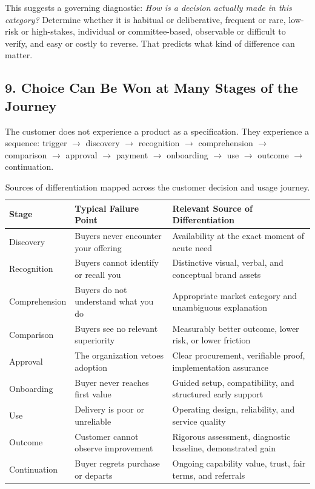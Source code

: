 This suggests a governing diagnostic: \emph{How is a decision actually made in this category?} Determine whether it is habitual or deliberative, frequent or rare, low-risk or high-stakes, individual or committee-based, observable or difficult to verify, and easy or costly to reverse. That predicts what kind of difference can matter.

\subsection*{9. Choice Can Be Won at Many Stages of the Journey}

The customer does not experience a product as a specification. They experience a sequence: trigger $\to$ discovery $\to$ recognition $\to$ comprehension $\to$ comparison $\to$ approval $\to$ payment $\to$ onboarding $\to$ use $\to$ outcome $\to$ continuation.

\begin{table}[t]
\centering
\small
\begin{tabularx}{\textwidth}{>{\raggedright\arraybackslash}p{2.8cm} >{\raggedright\arraybackslash}p{5.2cm} >{\raggedright\arraybackslash}X}
\toprule
\textbf{Stage} & \textbf{Typical Failure Point} & \textbf{Relevant Source of Differentiation} \\
\midrule
Discovery & Buyers never encounter your offering & Availability at the exact moment of acute need \\
Recognition & Buyers cannot identify or recall you & Distinctive visual, verbal, and conceptual brand assets \\
Comprehension & Buyers do not understand what you do & Appropriate market category and unambiguous explanation \\
Comparison & Buyers see no relevant superiority & Measurably better outcome, lower risk, or lower friction \\
Approval & The organization vetoes adoption & Clear procurement, verifiable proof, implementation assurance \\
Onboarding & Buyer never reaches first value & Guided setup, compatibility, and structured early support \\
Use & Delivery is poor or unreliable & Operating design, reliability, and service quality \\
Outcome & Customer cannot observe improvement & Rigorous assessment, diagnostic baseline, demonstrated gain \\
Continuation & Buyer regrets purchase or departs & Ongoing capability value, trust, fair terms, and referrals \\
\bottomrule
\end{tabularx}
\caption{Sources of differentiation mapped across the customer decision and usage journey.}
\label{tab:ch8-journey-stages}
\end{table}

